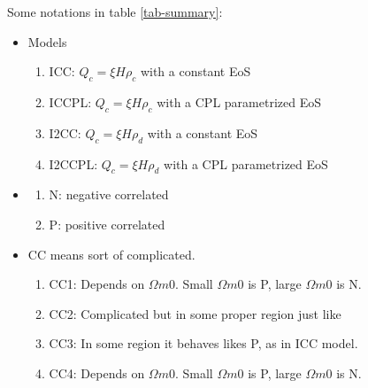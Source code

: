 \documentclass[12pt,a4paper]{article}
\begin{document}
Some notations in table \ref{tab-summary}:

\begin{itemize}
\item
Models
\begin{enumerate}
\item
ICC: $Q_c=\xi H \rho_c$ with a constant EoS
\item
ICCPL: $Q_c=\xi H \rho_c$ with a CPL parametrized EoS
\item
I2CC: $Q_c=\xi H \rho_d$ with a constant EoS
\item
I2CCPL: $Q_c=\xi H \rho_d$ with a CPL parametrized EoS
\end{enumerate}
\item
\begin{enumerate}
\item
N: negative correlated
\item
P: positive correlated
\end{enumerate}
\item
CC means sort of complicated.
\begin{enumerate}
\item
CC1: Depends on $\Omega m0$. Small $\Omega m0$ is P, large $\Omega m0$ is N.
\item
CC2: Complicated but in some proper region just like \tabICCPLtrxi
\item
CC3: In some region it behaves likes P, as in ICC model.
\item
CC4: Depends on $\Omega m0$. Small $\Omega m0$ is P, large $\Omega m0$ is N.
\end{enumerate}


\end{itemize}


\end{document}
